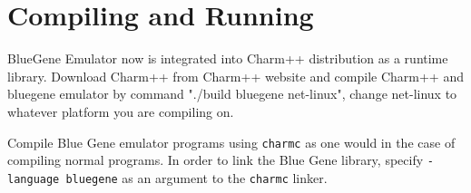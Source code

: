 \documentclass[10pt]{article}
\begin{document}
\section{Compiling and Running}

BlueGene Emulator now is integrated into Charm++ distribution as a runtime 
library. Download Charm++ from Charm++ website and compile Charm++ and bluegene
emulator by command "./build bluegene net-linux", change net-linux to whatever
platform you are compiling on.

Compile Blue Gene emulator programs using {\tt charmc} as one would
in the case of compiling normal \charmpp{} programs. In order to link the
Blue Gene library, specify \texttt{-language bluegene} as an argument
to the {\tt charmc} linker.


\end{document}
